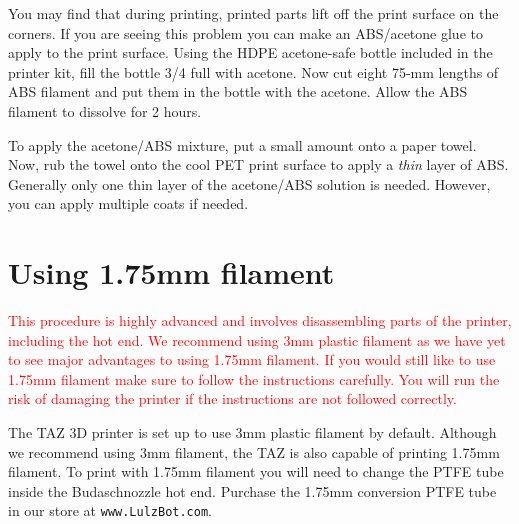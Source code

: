 You may find that during printing, printed parts lift off the print surface on the corners. If you are seeing this problem you can make an ABS/acetone glue to apply to the print surface. Using the HDPE acetone-safe bottle included in the printer kit, fill the bottle 3/4 full with acetone. Now cut eight 75-mm lengths of ABS filament and put them in the bottle with the acetone. Allow the ABS filament to dissolve for 2 hours.

To apply the acetone/ABS mixture, put a small amount onto a paper towel. Now, rub the towel onto the cool PET print surface to apply a \emph{thin} layer of ABS. Generally only one thin layer of the acetone/ABS solution is needed. However, you can apply multiple coats if needed.

\section{Using 1.75mm filament}
\textcolor{red}{This procedure is highly advanced and involves disassembling parts of the printer, including the hot end. We recommend using 3mm plastic filament as we have yet to see major advantages to using 1.75mm filament. If you would still like to use 1.75mm filament make sure to follow the instructions carefully. You will run the risk of damaging the printer if the instructions are not followed correctly.}

The TAZ 3D printer is set up to use 3mm plastic filament by default. Although we recommend using 3mm filament, the TAZ is also capable of printing 1.75mm filament. To print with 1.75mm filament you will need to change the PTFE tube inside the Budaschnozzle hot end. Purchase the 1.75mm conversion PTFE tube in our store at \texttt{www.LulzBot.com}.

